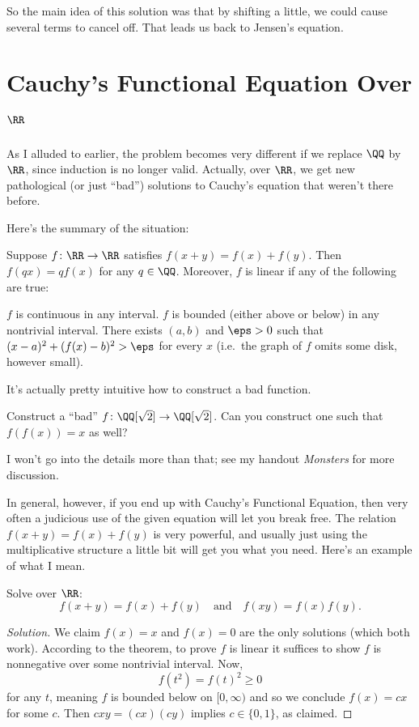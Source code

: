\documentclass[11pt]{scrartcl}
\begin{document}
So the main idea of this solution was that by shifting a little,
we could cause several terms to cancel off.
That leads us back to Jensen's equation.

\section{Cauchy's Functional Equation Over $\RR$}
As I alluded to earlier, the problem becomes very
different if we replace $\QQ$ by $\RR$, since
induction is no longer valid.
Actually, over $\RR$, we get new pathological (or just ``bad'')
solutions to Cauchy's equation that weren't there before.

Here's the summary of the situation:
\begin{theorem}
  Suppose $f \colon \RR \to \RR$ satisfies $f(x+y) = f(x) + f(y)$.
  Then $f(qx) = qf(x)$ for any $q \in \QQ$.
  Moreover, $f$ is linear if any of the following are true:
  \begin{itemize}
    \ii $f$ is continuous in any interval.
    \ii $f$ is bounded (either above or below) in any nontrivial interval.
    \ii There exists $(a,b)$ and $\eps > 0$ such that $(x-a)^2 + (f(x)-b)^2 > \eps$ for every $x$
    (i.e.\ the graph of $f$ omits some disk, however small).
  \end{itemize}
\end{theorem}
It's actually pretty intuitive how to construct a bad function.
\begin{exercise}
  Construct a ``bad'' $f \colon \QQ[\sqrt2] \to \QQ[\sqrt2]$.
  Can you construct one such that $f(f(x)) = x$ as well?
\end{exercise}
I won't go into the details more than that; see my handout \emph{Monsters} for more discussion.

In general, however, if you end up with Cauchy's Functional Equation,
then very often a judicious use of the given equation will let you break free.
The relation $f(x+y) = f(x) + f(y)$ is very powerful,
and usually just using the multiplicative structure a little bit will get you what you need.
Here's an example of what I mean.

\begin{example}
  Solve over $\RR$:
  \[ f(x+y) = f(x) + f(y) \quad\text{and}\quad f(xy) = f(x)f(y). \]
\end{example}
\begin{proof}
  [Solution]
  We claim $f(x) = x$ and $f(x) = 0$ are the only solutions (which both work).
  According to the theorem, to prove $f$ is linear it suffices to show $f$ is nonnegative
  over some nontrivial interval.
  Now, \[ f(t^2) = f(t)^2 \ge 0 \] for any $t$,
  meaning $f$ is bounded below on $[0,\infty)$
  and so we conclude $f(x) = cx$ for some $c$.
  Then $cxy = (cx)(cy)$ implies $c \in \{0,1\}$, as claimed.
\end{proof}
\end{document}
